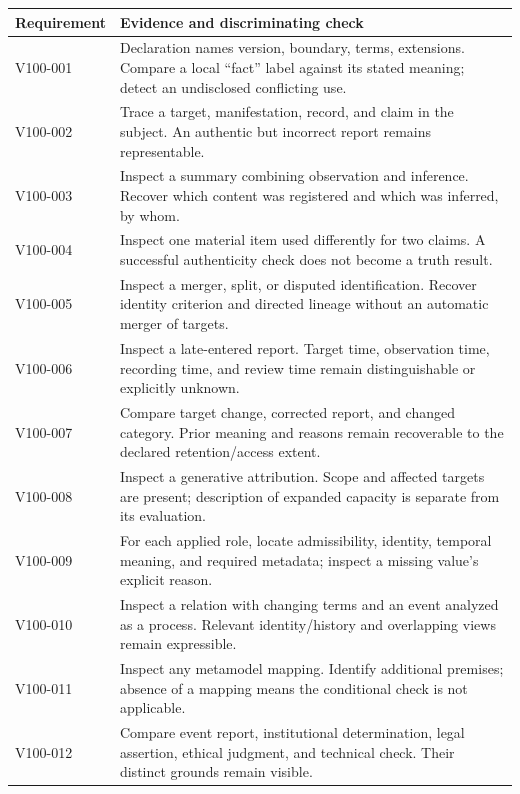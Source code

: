 \documentclass[11pt,a4paper]{article}
\begin{document}
\begin{longtable}{@{}L{0.17\textwidth}L{0.77\textwidth}@{}}
\toprule
Requirement & Evidence and discriminating check \\
\midrule\endhead
V100-001 & Declaration names version, boundary, terms, extensions. Compare a local ``fact'' label against its stated meaning; detect an undisclosed conflicting use. \\
V100-002 & Trace a target, manifestation, record, and claim in the subject. An authentic but incorrect report remains representable. \\
V100-003 & Inspect a summary combining observation and inference. Recover which content was registered and which was inferred, by whom. \\
V100-004 & Inspect one material item used differently for two claims. A successful authenticity check does not become a truth result. \\
V100-005 & Inspect a merger, split, or disputed identification. Recover identity criterion and directed lineage without an automatic merger of targets. \\
V100-006 & Inspect a late-entered report. Target time, observation time, recording time, and review time remain distinguishable or explicitly unknown. \\
V100-007 & Compare target change, corrected report, and changed category. Prior meaning and reasons remain recoverable to the declared retention/access extent. \\
V100-008 & Inspect a generative attribution. Scope and affected targets are present; description of expanded capacity is separate from its evaluation. \\
V100-009 & For each applied role, locate admissibility, identity, temporal meaning, and required metadata; inspect a missing value's explicit reason. \\
V100-010 & Inspect a relation with changing terms and an event analyzed as a process. Relevant identity/history and overlapping views remain expressible. \\
V100-011 & Inspect any metamodel mapping. Identify additional premises; absence of a mapping means the conditional check is not applicable. \\
V100-012 & Compare event report, institutional determination, legal assertion, ethical judgment, and technical check. Their distinct grounds remain visible. \\
\bottomrule
\end{longtable}
\end{document}
